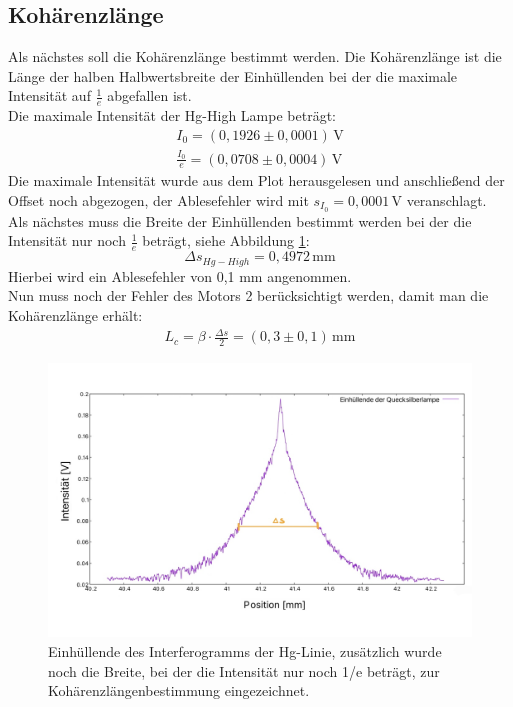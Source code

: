 \subsection{Kohärenzlänge}
Als nächstes soll die Kohärenzlänge bestimmt werden. Die Kohärenzlänge ist die Länge der halben Halbwertsbreite der Einhüllenden bei der
die maximale Intensität auf $\frac{1}{e}$ abgefallen ist.\\
Die maximale Intensität der Hg-High Lampe beträgt:
\begin{align}
 I_0 = (0,1926 \pm 0,0001)\,\text{V}  \\
 \frac{I_0}{e} = (0,0708 \pm 0,0004)\,\text{V} 
\end{align}
Die maximale Intensität wurde aus dem Plot herausgelesen und anschließend der Offset noch abgezogen, der Ablesefehler wird 
mit $s_{I_0} = 0,0001\,\text{V}$ veranschlagt.\\
Als nächstes muss die Breite der Einhüllenden bestimmt werden bei der die Intensität nur noch $\frac{1}{e}$
beträgt, siehe Abbildung \ref{fig:HgHighf}:
\begin{equation}
    \Delta s_{Hg-High} = 0,4972\,\text{mm}
\end{equation}
Hierbei wird ein Ablesefehler von 0,1 mm angenommen.\\
Nun muss noch der Fehler des Motors 2 berücksichtigt werden, damit man die Kohärenzlänge erhält:
\begin{align}
    L_c = \beta \cdot \frac{\Delta s}{2} = (0,3 \pm 0,1)\,\text{mm}
\end{align}
\begin{figure}[h]
    \centering
    \includegraphics[scale = 0.32]{Bilder/Anna/high1_e.jpg}
    \caption{Einhüllende des Interferogramms der Hg-Linie, zusätzlich wurde noch die Breite, bei der die Intensität nur noch 1/e beträgt, zur Kohärenzlängenbestimmung eingezeichnet.}
    \label{fig:HgHighf}
\end{figure}
\newpage
